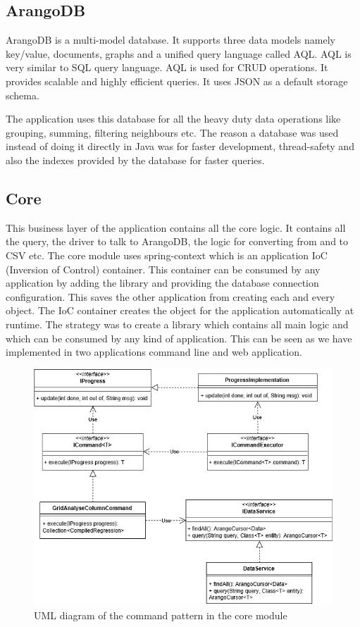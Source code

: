 \subsection{ArangoDB}

ArangoDB is a multi-model database. It supports three data models namely key/value, documents, graphs and a unified query language called AQL. AQL is very similar to SQL query language. AQL is used for CRUD operations. It provides scalable and highly efficient queries. It uses JSON as a default storage schema. 

The application uses this database for all the heavy duty data operations like grouping, summing, filtering neighbours etc. The reason a database was used instead of doing it directly in Java was for faster development, thread-safety and also the indexes provided by the database for faster queries. 

\subsection{Core}

This business layer of the application contains all the core logic. It contains all the query, the driver to talk to ArangoDB, the logic for converting from and to CSV etc. The core module uses spring-context which is an application IoC (Inversion of Control) container. This container can be consumed by any application by adding the library and providing the database connection configuration. This saves the other application from creating each and every object. The IoC container creates the object for the application automatically at runtime. The strategy was to create a library which contains all main logic and which can be consumed by any kind of application. This can be seen as we have implemented in two applications command line and web application.

\begin{figure}[!ht]
    \centering
    \includegraphics[width=400pt]{umlcore}
    \caption{\label{fig:umlcore} UML diagram of the command pattern in the core module}
\end{figure}

